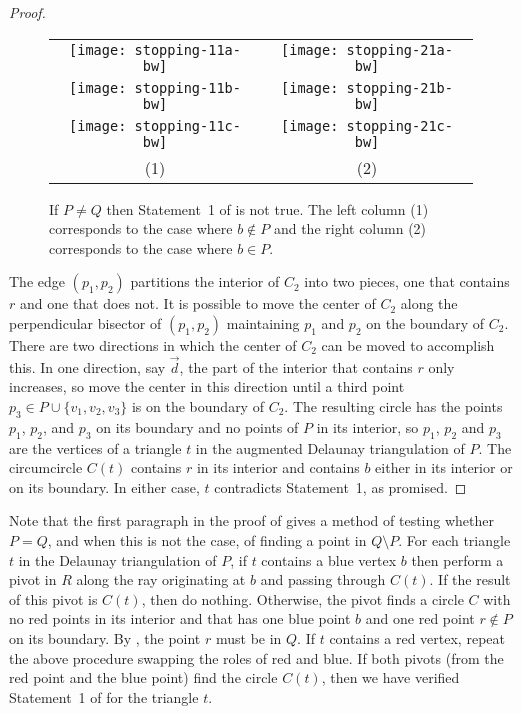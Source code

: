 \documentclass[lotsofwhite,charterfonts]{patmorin}
\begin{document}
\begin{proof}
\begin{figure}
\begin{center}\begin{tabular}{cc}
\texttt{[image: stopping-11a-bw]} & \texttt{[image: stopping-21a-bw]} \\[2ex] 
\texttt{[image: stopping-11b-bw]} & \texttt{[image: stopping-21b-bw]} \\[2ex]
\texttt{[image: stopping-11c-bw]} & \texttt{[image: stopping-21c-bw]} \\[1ex]
(1) & (2)
\end{tabular}\end{center}
\caption{If $P\neq Q$ then Statement~1 of  is not
true. 
The left column (1) corresponds to the case where $b\not\in
P$ and the right column (2) corresponds to the case where $b\in
P$.}
\end{figure}

The edge $(p_1,p_2)$ partitions the interior of $C_2$ into two pieces,
one that contains $r$ and one that does not.  It is possible to move
the center of $C_2$ along the perpendicular bisector of $(p_1,p_2)$
maintaining $p_1$ and $p_2$ on the boundary of $C_2$.  There are two
directions in which the center of $C_2$ can be moved to accomplish
this.  In one direction, say $\overrightarrow{d}$, the part of the
interior that contains $r$ only increases, so move the center in this
direction until a third point $p_3\in P\cup\{v_1,v_2,v_3\}$ is on the
boundary of $C_2$.  The resulting circle has the points $p_1$, $p_2$,
and $p_3$ on its boundary and no points of $P$ in its interior, so
$p_1$, $p_2$ and $p_3$ are the vertices of a triangle $t$ in the
augmented Delaunay triangulation of $P$.  The circumcircle $C(t)$
contains $r$ in its interior and contains $b$ either in its interior
or on its boundary.  In either case, $t$ contradicts Statement~1, as
promised.  
\end{proof}

Note that the first paragraph in the proof of  gives
a method of testing whether $P=Q$, and when this is not the case, of
finding a point in $Q\setminus P$.  For each triangle $t$ in the
Delaunay triangulation of $P$, if $t$ contains a blue vertex $b$ then
perform a pivot in $R$ along the ray originating at $b$ and passing
through $C(t)$.  If the result of this pivot is $C(t)$, then do
nothing.  Otherwise, the pivot finds a circle $C$ with no red points
in its interior and that has one blue point $b$ and one red point
$r\notin P$ on its boundary.  By , the point $r$ must
be in $Q$.  If $t$ contains a red vertex, repeat the above procedure
swapping the roles of red and blue.  If both pivots (from the red
point and the blue point) find the circle $C(t)$, then we have
verified Statement~1 of  for the triangle $t$.
\end{document}
